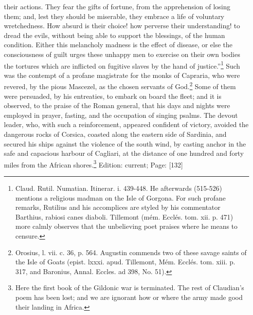 their actions. They fear the gifts of fortune, from the apprehension of losing them; and, lest they should be miserable, they embrace a life of voluntary wretchedness. How absurd is their choice! how perverse their understanding! to dread the evils, without being able to support the blessings, of the human condition. Either this melancholy madness is the effect of disease, or else the consciousness of guilt urges these unhappy men to exercise on their own bodies the tortures which are inflicted on fugitive slaves by the hand of justice.\texthebrew{}”\footnote{Claud. Rutil. Numatian. Itinerar. i. 439-448. He afterwards (515-526) mentions a religious madman on the Isle of Gorgona. For such profane remarks, Rutilius and his accomplices are styled by his commentator Barthius, rabiosi canes diaboli. Tillemont (mém. Ecclés. tom. xii. p. 471) more calmly observes that the unbelieving poet praises where he means to censure.} Such was the contempt of a profane magistrate for the monks of Capraria, who were revered, by the pious Mascezel, as the chosen servants of God.\footnote{Orosius, l. vii. c. 36, p. 564. Augustin commends two of these savage saints of the Isle of Goats (epist. lxxxi. apud. Tillemont, Mém. Ecclés. tom. xiii. p. 317, and Baronius, Annal. Eccles. ad 398, No. 51).} Some of them were persuaded, by his entreaties, to embark on board the fleet; and it is observed, to the praise of the Roman general, that his days and nights were employed in prayer, fasting, and the occupation of singing psalms. The devout leader, who, with such a reinforcement, appeared confident of victory, avoided the dangerous rocks of Corsica, coasted along the eastern side of Sardinia, and secured his ships against the violence of the south wind, by casting anchor in the safe and capacious harbour of Cagliari, at the distance of one hundred and forty miles from the African shores.\footnote{Here the first book of the Gildonic war is terminated. The rest of Claudian\texthebrew{}’s poem has been lost; and we are ignorant how or where the army made good their landing in Africa.}
Edition: current; Page: [132]

